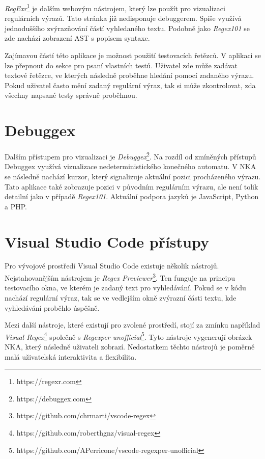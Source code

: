\textit{RegExr}\footnote{https://regexr.com} je dalším webovým nástrojem, který lze použít pro vizualizaci regulárních výrazů.
Tato stránka již nedisponuje debuggerem.
Spíše využívá jednoduššího zvýrazňování částí vyhledaného textu.
Podobně jako \textit{Regex101} se zde nachází zobrazení AST s popisem syntaxe.

Zajímavou částí této aplikace je možnost použití testovacích řetězců.
V aplikaci se lze přepnout do sekce pro psaní vlastních testů.
Uživatel zde může zadávat textové řetězce, ve kterých následně proběhne hledání pomocí zadaného výrazu.
Pokud uživatel často mění zadaný regulární výraz, tak si může zkontrolovat, zda všechny napsané testy správně proběhnou.

\section{Debuggex}

Dalším přístupem pro vizualizaci je \textit{Debuggex}\footnote{https://debuggex.com}.
Na rozdíl od zmíněných přístupů Debuggex využívá vizualizace nedeterministického konečného automatu.
V NKA se následně nachází kurzor, který signalizuje aktuální pozici procházeného výrazu.
Tato aplikace také zobrazuje pozici v původním regulárním výrazu, ale není tolik detailní jako v případě \textit{Regex101}.
Aktuální podpora jazyků je JavaScript, Python a PHP.

\section{Visual Studio Code přístupy}

Pro vývojové prostředí Visual Studio Code existuje několik nástrojů.
Nejstahovanějším nástrojem je \textit{Regex Previewer}\footnote{https://github.com/chrmarti/vscode-regex}.
Ten funguje na principu testovacího okna, ve kterém je zadaný text pro vyhledávání.
Pokud se v kódu nachází regulární výraz, tak se ve vedlejším okně zvýrazní části textu, kde vyhledávání proběhlo úspěšně. 

Mezi další nástroje, které existují pro zvolené prostředí, stojí za zmínku například \textit{Visual Regex}\footnote{https://github.com/roberthgnz/visual-regex} společně s \textit{Regexper unofficial}\footnote{https://github.com/APerricone/vscode-regexper-unofficial}.
Tyto nástroje vygenerují obrázek NKA, který následně uživateli zobrazí.
Nedostatkem těchto nástrojů je poměrně malá uživatelská interaktivita a flexibilita.
